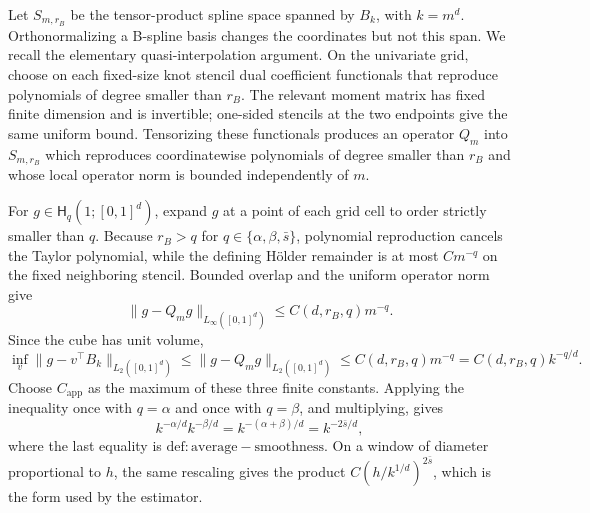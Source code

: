 Let \(S_{m,r_B}\) be the tensor-product spline space spanned by \(B_k\), with \(k=m^d\). Orthonormalizing a B-spline basis changes the coordinates but not this span. We recall the elementary quasi-interpolation argument. On the univariate grid, choose on each fixed-size knot stencil dual coefficient functionals that reproduce polynomials of degree smaller than \(r_B\). The relevant moment matrix has fixed finite dimension and is invertible; one-sided stencils at the two endpoints give the same uniform bound. Tensorizing these functionals produces an operator \(Q_m\) into \(S_{m,r_B}\) which reproduces coordinatewise polynomials of degree smaller than \(r_B\) and whose local operator norm is bounded independently of \(m\).

For \(g\in\mathsf H_q(1;[0,1]^d)\), expand \(g\) at a point of each grid cell to order strictly smaller than \(q\). Because \(r_B>q\) for \(q\in\{\alpha,\beta,\bar s\}\), polynomial reproduction cancels the Taylor polynomial, while the defining Hölder remainder is at most \(C m^{-q}\) on the fixed neighboring stencil. Bounded overlap and the uniform operator norm give
\[
\|g-Q_mg\|_{L_\infty([0,1]^d)}\le C(d,r_B,q)m^{-q}.
\]
Since the cube has unit volume,
\[
\inf_v\|g-v^\top B_k\|_{L_2([0,1]^d)}
\le \|g-Q_mg\|_{L_2([0,1]^d)}
\le C(d,r_B,q)m^{-q}
=C(d,r_B,q)k^{-q/d}.
\]
Choose \(C_{\mathrm{app}}\) as the maximum of these three finite constants. Applying the inequality once with \(q=\alpha\) and once with \(q=\beta\), and multiplying, gives
\[
k^{-\alpha/d}k^{-\beta/d}=k^{-(\alpha+\beta)/d}=k^{-2\bar s/d},
\]
where the last equality is \(\mathrm{def:average-smoothness}\). On a window of diameter proportional to \(h\), the same rescaling gives the product \(C(h/k^{1/d})^{2\bar s}\), which is the form used by the estimator.